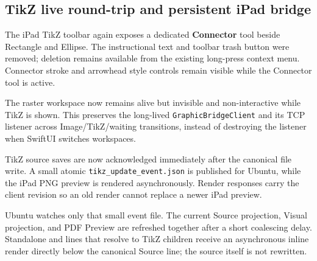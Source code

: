 \documentclass[a4paper]{article}
\title{}
\date{}
\author{Mohammad Rahmani}
\begin{document}
   \maketitle

   \begin{preview}
      \section*{TikZ live round-trip and persistent iPad bridge}

The iPad TikZ toolbar again exposes a dedicated \textbf{Connector} tool beside Rectangle and Ellipse. The instructional text and toolbar trash button were removed; deletion remains available from the existing long-press context menu. Connector stroke and arrowhead style controls remain visible while the Connector tool is active.

The raster workspace now remains alive but invisible and non-interactive while TikZ is shown. This preserves the long-lived \texttt{GraphicBridgeClient} and its TCP listener across Image/TikZ/waiting transitions, instead of destroying the listener when SwiftUI switches workspaces.

TikZ source saves are now acknowledged immediately after the canonical file write. A small atomic \texttt{tikz\_update\_event.json} is published for Ubuntu, while the iPad PNG preview is rendered asynchronously. Render responses carry the client revision so an old render cannot replace a newer iPad preview.

Ubuntu watches only that small event file. The current Source projection, Visual projection, and PDF Preview are refreshed together after a short coalescing delay. Standalone \verb|| and \verb|| lines that resolve to TikZ children receive an asynchronous inline render directly below the canonical Source line; the source itself is not rewritten.

   \end{preview}

   
   
\end{document}
